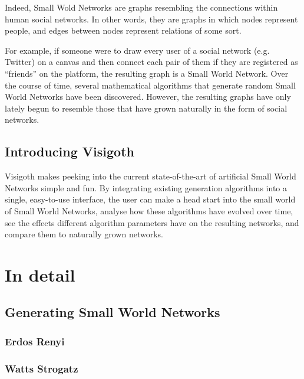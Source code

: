 \documentclass[a4paper,11pt,titlepage]{article}
\let\stdsection\section         %
\renewcommand{\section}{\newpage\stdsection}
\begin{document}
Indeed, Small Wold Networks are graphs resembling the connections
within human social networks. In other words, they are graphs in which
nodes represent people, and edges between nodes represent relations of
some sort.

For example, if someone were to draw every user of a social network
(e.g. Twitter) on a canvas and then connect each pair of them if they
are registered as “friends” on the platform, the resulting graph is a
Small World Network.  Over the course of time, several mathematical
algorithms that generate random Small World Networks have been
discovered. However, the resulting graphs have only lately begun to
resemble those that have grown naturally in the form of social
networks.

\subsection{Introducing Visigoth}

Visigoth makes peeking into the current state-of-the-art of artificial
Small World Networks simple and fun. By integrating existing
generation algorithms into a single, easy-to-use interface, the user
can make a head start into the small world of Small World Networks,
analyse how these algorithms have evolved over time, see the effects
different algorithm parameters have on the resulting networks, and
compare them to naturally grown networks.

\section{In detail}

\subsection{Generating Small World Networks}

\subsubsection{Erdos Renyi}

\subsubsection{Watts Strogatz}
\end{document}
